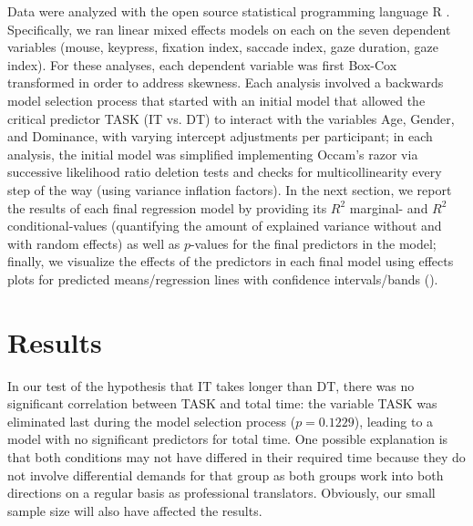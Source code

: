 \documentclass[output=paper]{langscibook}
\begin{document}
Data were analyzed with the open source statistical programming language R \citep{R}. Specifically, we ran linear mixed effects models on each on the seven dependent variables (mouse, keypress, fixation index, saccade index, gaze duration, gaze index). For these analyses, each dependent variable was first Box-Cox transformed in order to address skewness. Each analysis involved a backwards model selection process that started with an initial model that allowed the critical predictor TASK (IT vs. DT) to interact with the variables Age, Gender, and Dominance, with varying intercept adjustments per participant; in each analysis, the initial model was simplified implementing Occam’s razor via successive likelihood ratio deletion tests and checks for multicollinearity every step of the way (using variance inflation factors). In the next section, we report the results of each final regression model by providing its $R^2$ marginal- and $R^2$ conditional-values (quantifying the amount of explained variance without and with random effects) as well as $p$-values for the final predictors in the model; finally, we visualize the effects of the predictors in each final model using effects plots for predicted means/regression lines with confidence intervals/bands (\citealt{fox2019r}).

\section{Results}

In our test of the hypothesis that IT takes longer than DT, there was no significant correlation between TASK and total time: the variable TASK was eliminated last during the model selection process ($p = 0.1229$), leading to a model with no significant predictors for total time. One possible explanation is that both conditions may not have differed in their required time because they do not involve differential demands for that group as both groups work into both directions on a regular basis as professional translators. Obviously, our small sample size will also have affected the results.
\end{document}
